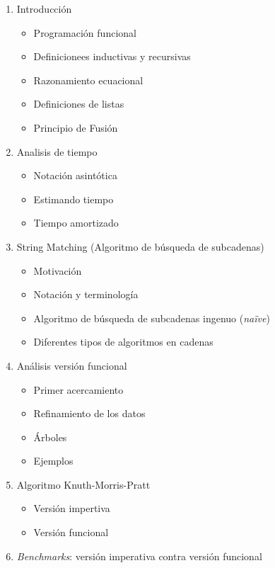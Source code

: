\documentclass[letterpaper,10pt]{article}
\begin{document}
\begin{enumerate}

    \item Introducción
    \begin{itemize}
        \item Programación funcional
        \item Definicionees inductivas y recursivas
        \item Razonamiento ecuacional
        \item Definiciones de listas
        \item Principio de Fusión
    \end{itemize}

    \item Analisis de tiempo
    \begin{itemize}
        \item Notación asintótica
        \item Estimando tiempo
        \item Tiempo amortizado
    \end{itemize}

    \item String Matching (Algoritmo de búsqueda de subcadenas)
    \begin{itemize}
        \item Motivación
        \item Notación y terminología
        \item Algoritmo de búsqueda de subcadenas ingenuo (\textit{naïve})
        \item Diferentes tipos de algoritmos en cadenas
    \end{itemize}

    \item Análisis versión funcional
    \begin{itemize}
        \item Primer acercamiento
        \item Refinamiento de los datos
        \item Árboles
        \item Ejemplos
    \end{itemize}

    \item Algoritmo Knuth-Morris-Pratt
    \begin{itemize}
        \item Versión impertiva
        \item Versión funcional
    \end{itemize}
    
    \item \textit{Benchmarks}: versión imperativa contra versión funcional 

\end{enumerate}
\end{document}
